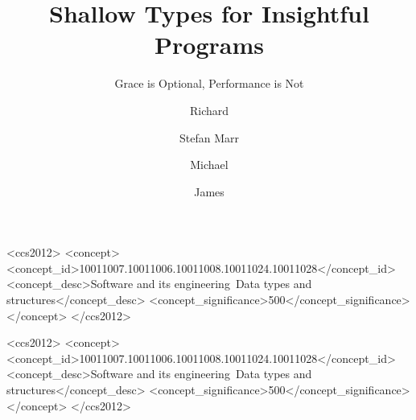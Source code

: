 \documentclass[sigplan, review, 10pt]{acmart}
\begin{document}
\title{Shallow Types for Insightful Programs}
\subtitle{Grace is Optional, Performance is Not}

\author{Richard}
\email{}


\author{Stefan Marr}

\author{Michael}
\orcid{}
\email{}

\author{James}
\orcid{}
\email{}

\renewcommand{\shortauthors}{R. Roberts et al.}




%
%
\begin{CCSXML}
<ccs2012>
<concept>
<concept_id>10011007.10011006.10011008.10011024.10011028</concept_id>
<concept_desc>Software and its engineering~Data types and structures</concept_desc>
<concept_significance>500</concept_significance>
</concept>
</ccs2012>
\end{CCSXML}




\begin{CCSXML}
<ccs2012>
<concept>
<concept_id>10011007.10011006.10011008.10011024.10011028</concept_id>
<concept_desc>Software and its engineering~Data types and structures</concept_desc>
<concept_significance>500</concept_significance>
</concept>
</ccs2012>
\end{CCSXML}
\end{document}
